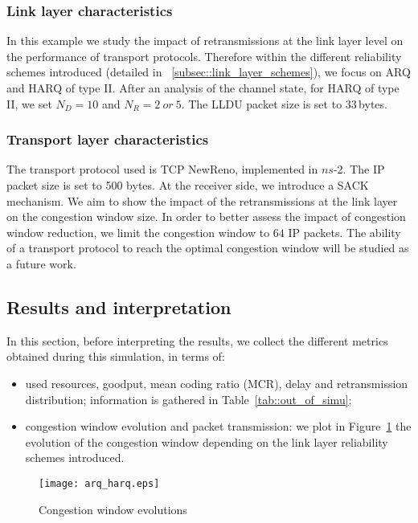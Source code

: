 \documentclass[conference,letterpaper]{IEEEtran}
\begin{document}
\subsubsection{Link layer characteristics}
In this example we study the impact of retransmissions at the link layer level on the performance of transport protocols. Therefore within the different reliability schemes introduced (detailed in ~\ref{subsec::link_layer_schemes}), we focus on ARQ and HARQ of type II. After an analysis of the channel state, for HARQ of type II, we set $N_D=10$ and $N_R=2~or~5$. The LLDU packet size is set to 33\,bytes.

\subsubsection{Transport layer characteristics}
The transport protocol used is TCP NewReno, implemented in $ns$-2. The IP packet size is set to 500 bytes. At the receiver side, we introduce a SACK mechanism. We aim to show the impact of the retransmissions at the link layer on the congestion window size. In order to better assess the impact of congestion window reduction, we limit the congestion window to $64$ IP packets. The ability of a transport protocol to reach the optimal congestion window will be studied as a future work.

\subsection{Results and interpretation}
\label{subsec::illustration_interpretation}
In this section, before interpreting the results, we collect the different metrics obtained during this simulation, in terms of: 
\begin{itemize}
\item used resources, goodput, mean coding ratio (MCR), delay and retransmission distribution; information is gathered in Table~\ref{tab::out_of_simu};
\item congestion window evolution and packet transmission: we plot in Figure~\ref{fig::cwnd_arq_harq} the evolution of the congestion window depending on the link layer reliability schemes introduced.
\end{itemize}

\begin{figure}[h]
    \begin{center}
	\texttt{[image: arq\_harq.eps]}
	\caption{Congestion window evolutions}
	\label{fig::cwnd_arq_harq}
    \end{center}
\end{figure}
\end{document}
